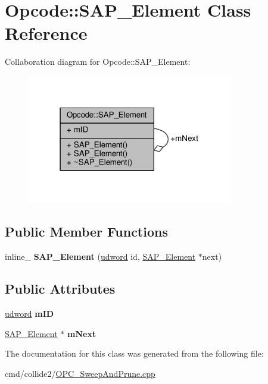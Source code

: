 \hypertarget{classOpcode_1_1SAP__Element}{}\section{Opcode\+:\+:S\+A\+P\+\_\+\+Element Class Reference}
\label{classOpcode_1_1SAP__Element}


Collaboration diagram for Opcode\+:\+:S\+A\+P\+\_\+\+Element\+:
\nopagebreak
\begin{figure}[H]
\begin{center}
\leavevmode
\includegraphics[width=255pt]{d7/d5c/classOpcode_1_1SAP__Element__coll__graph}
\end{center}
\end{figure}
\subsection*{Public Member Functions}
\begin{DoxyCompactItemize}
\item 
inline\+\_\+ {\bfseries S\+A\+P\+\_\+\+Element} (\hyperlink{IceTypes_8h_a44c6f1920ba5551225fb534f9d1a1733}{udword} id, \hyperlink{classOpcode_1_1SAP__Element}{S\+A\+P\+\_\+\+Element} $\ast$next)\hypertarget{classOpcode_1_1SAP__Element_a7c618b5ff8abc1df368e26685ac26303}{}\label{classOpcode_1_1SAP__Element_a7c618b5ff8abc1df368e26685ac26303}

\end{DoxyCompactItemize}
\subsection*{Public Attributes}
\begin{DoxyCompactItemize}
\item 
\hyperlink{IceTypes_8h_a44c6f1920ba5551225fb534f9d1a1733}{udword} {\bfseries m\+ID}\hypertarget{classOpcode_1_1SAP__Element_ae70a0b860616d12fcd7df3de5b755f1e}{}\label{classOpcode_1_1SAP__Element_ae70a0b860616d12fcd7df3de5b755f1e}

\item 
\hyperlink{classOpcode_1_1SAP__Element}{S\+A\+P\+\_\+\+Element} $\ast$ {\bfseries m\+Next}\hypertarget{classOpcode_1_1SAP__Element_aa8475c40c88bd7161cdf28c453f3cafe}{}\label{classOpcode_1_1SAP__Element_aa8475c40c88bd7161cdf28c453f3cafe}

\end{DoxyCompactItemize}


The documentation for this class was generated from the following file\+:\begin{DoxyCompactItemize}
\item 
cmd/collide2/\hyperlink{OPC__SweepAndPrune_8cpp}{O\+P\+C\+\_\+\+Sweep\+And\+Prune.\+cpp}\end{DoxyCompactItemize}
